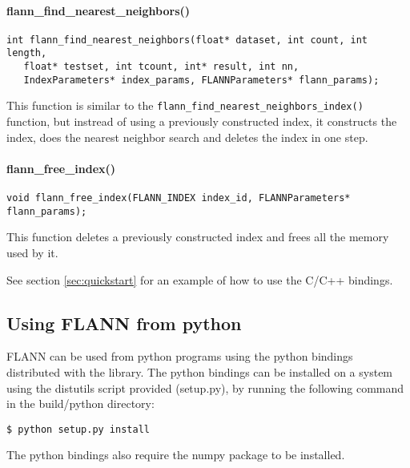 \documentclass[letter,10pt]{article}
\begin{document}
\paragraph{flann\_find\_nearest\_neighbors()}
\begin{Verbatim}[fontsize=\footnotesize,frame=single]
int flann_find_nearest_neighbors(float* dataset, int count, int length,
   float* testset, int tcount, int* result, int nn, 
   IndexParameters* index_params, FLANNParameters* flann_params);
\end{Verbatim}
This function is similar to the
\texttt{flann\_find\_nearest\_neighbors\_index()} function, but instread of
using a previously constructed index, it constructs the index, does the nearest
neighbor search and deletes the index in one step.




\paragraph{flann\_free\_index()}
\begin{Verbatim}[fontsize=\footnotesize,frame=single]
void flann_free_index(FLANN_INDEX index_id, FLANNParameters* flann_params);
\end{Verbatim}
This function deletes a previously constructed index and frees all the memory
used by it.

\bigskip

See section \ref{sec:quickstart} for an example of how to use the C/C++
bindings.

\subsection{Using FLANN from python}

FLANN can be used from python programs using the python bindings distributed
with the library. The python bindings can be installed on a system using the
distutils script provided (setup.py), by running the following command in the
build/python directory:
\begin{Verbatim}[fontsize=\footnotesize,frame=single]
$ python setup.py install
\end{Verbatim}
The python bindings also require the numpy package to be installed.
\end{document}
